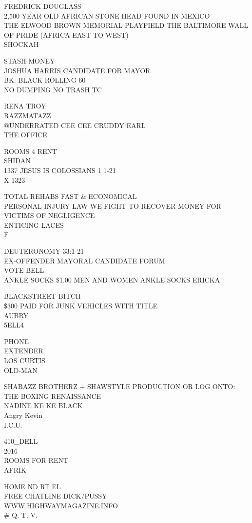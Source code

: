 \documentclass[10pt,letterpaper]{article}
\begin{document}
FREDRICK DOUGLASS\\
2,500 YEAR OLD AFRICAN STONE HEAD FOUND IN MEXICO\\
THE ELWOOD BROWN MEMORIAL PLAYFIELD THE BALTIMORE WALL OF PRIDE (AFRICA EAST TO WEST)\\
SHOCKAH

STASH MONEY\\
JOSHUA HARRIS CANDIDATE FOR MAYOR\\
BK: BLACK ROLLING 60\\
NO DUMPING NO TRASH TC

RENA TROY\\
RAZZMATAZZ\\
@UNDERRATED CEE CEE CRUDDY EARL\\
THE OFFICE

ROOMS 4 RENT\\
SHIDAN\\
1337 JESUS IS COLOSSIANS 1 1{-}21\\
X 1323

TOTAL REHABS FAST \& ECONOMICAL\\
PERSONAL INJURY LAW WE FIGHT TO RECOVER MONEY FOR VICTIMS OF NEGLIGENCE\\
ENTICING LACES\\
F

DEUTERONOMY 33:1{-}21\\
EX{-}OFFENDER MAYORAL CANDIDATE FORUM\\
VOTE BELL\\
ANKLE SOCKS \$1.00 MEN AND WOMEN ANKLE SOCKS ERICKA

BLACKSTREET BITCH\\
\$300 PAID FOR JUNK VEHICLES WITH TITLE\\
AUBRY\\
5ELL4

PHONE\\
EXTENDER\\
LOS CURTIS\\
OLD{-}MAN

SHABAZZ BROTHERZ + SHAWSTYLE PRODUCTION OR LOG ONTO: THE BOXING RENAISSANCE\\
NADINE KE KE BLACK\\
Angry Kevin\\
I.C.U.

410\_DELL\\
2016\\
ROOMS FOR RENT\\
AFRIK

HOME ND RT EL\\
FREE CHATLINE DICK/PUSSY\\
WWW.HIGHWAYMAGAZINE.INFO\\
\# Q. T. V.
\end{document}
